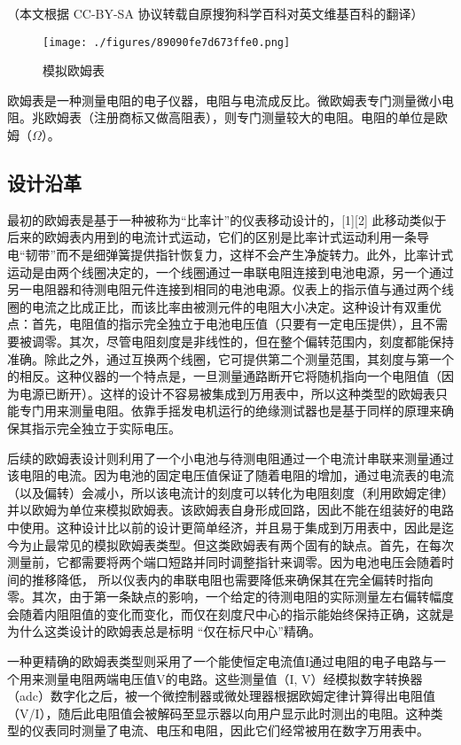 
（本文根据 CC-BY-SA 协议转载自原搜狗科学百科对英文维基百科的翻译）

\begin{figure}[ht]
\centering
\texttt{[image: ./figures/89090fe7d673ffe0.png]}
\caption{模拟欧姆表} \label{fig_OMB_1}
\end{figure}
欧姆表是一种测量电阻的电子仪器，电阻与电流成反比。微欧姆表专门测量微小电阻。兆欧姆表（注册商标又做高阻表），则专门测量较大的电阻。电阻的单位是欧姆（$\Omega
$）。

\subsection{设计沿革}
最初的欧姆表是基于一种被称为“比率计”的仪表移动设计的，[1][2] 此移动类似于后来的欧姆表内用到的电流计式运动，它们的区别是比率计式运动利用一条导电“韧带”而不是细弹簧提供指针恢复力，这样不会产生净旋转力。此外，比率计式运动是由两个线圈决定的，一个线圈通过一串联电阻连接到电池电源，另一个通过另一电阻器和待测电阻元件连接到相同的电池电源。仪表上的指示值与通过两个线圈的电流之比成正比，而该比率由被测元件的电阻大小决定。这种设计有双重优点：首先，电阻值的指示完全独立于电池电压值（只要有一定电压提供），且不需要被调零。其次，尽管电阻刻度是非线性的，但在整个偏转范围内，刻度都能保持准确。除此之外，通过互换两个线圈，它可提供第二个测量范围，其刻度与第一个的相反。这种仪器的一个特点是，一旦测量通路断开它将随机指向一个电阻值（因为电源已断开）。这样的设计不容易被集成到万用表中，所以这种类型的欧姆表只能专门用来测量电阻。依靠手摇发电机运行的绝缘测试器也是基于同样的原理来确保其指示完全独立于实际电压。

后续的欧姆表设计则利用了一个小电池与待测电阻通过一个电流计串联来测量通过该电阻的电流。因为电池的固定电压值保证了随着电阻的增加，通过电流表的电流（以及偏转）会减小，所以该电流计的刻度可以转化为电阻刻度（利用欧姆定律）并以欧姆为单位来模拟欧姆表。该欧姆表自身形成回路，因此不能在组装好的电路中使用。这种设计比以前的设计更简单经济，并且易于集成到万用表中，因此是迄今为止最常见的模拟欧姆表类型。但这类欧姆表有两个固有的缺点。首先，在每次测量前，它都需要将两个端口短路并同时调整指针来调零。因为电池电压会随着时间的推移降低， 所以仪表内的串联电阻也需要降低来确保其在完全偏转时指向零。其次，由于第一条缺点的影响，一个给定的待测电阻的实际测量左右偏转幅度会随着内阻阻值的变化而变化，而仅在刻度尺中心的指示能始终保持正确，这就是为什么这类设计的欧姆表总是标明 “仅在标尺中心”精确。

一种更精确的欧姆表类型则采用了一个能使恒定电流值I通过电阻的电子电路与一个用来测量电阻两端电压值V的电路。这些测量值（I, V）经模拟数字转换器（adc）数字化之后，被一个微控制器或微处理器根据欧姆定律计算得出电阻值（V/I），随后此电阻值会被解码至显示器以向用户显示此时测出的电阻。这种类型的仪表同时测量了电流、电压和电阻，因此它们经常被用在数字万用表中。

